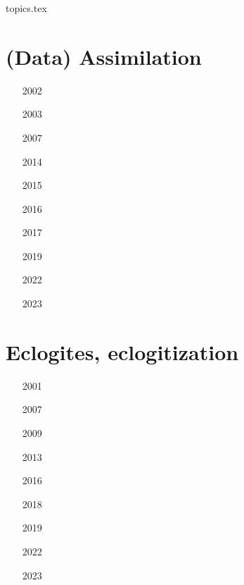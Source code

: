 
\begin{flushright} {\tiny {\color{gray} topics.tex}} \end{flushright}


\section{(Data) Assimilation}

\begin{small}
\begin{itemize}
\item[2002]
\item[2003]
\item[2007]
\item[2014]
\item[2015]
\item[2016]
\item[2017]
\item[2019]
\item[2022]
\item[2023]
\end{itemize}
\end{small}

\section{Eclogites, eclogitization}

\begin{small}
\begin{itemize}
\item[2001]
\item[2007]
\item[2009]
\item[2013]
\item[2016]
\item[2018]
\item[2019]
\item[2022]
\item[2023]
\item[\twothousandtwentyfour]
\end{itemize}
\end{small}

